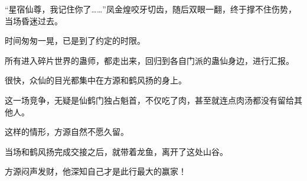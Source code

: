 \begin{this_body}
“星宿仙尊，我记住你了……”凤金煌咬牙切齿，随后双眼一翻，终于撑不住伤势，当场昏迷过去。

时间匆匆一晃，已是到了约定的时限。

所有进入碎片世界的蛊师，都走出来，回归到各自门派的蛊仙身边，进行汇报。

很快，众仙的目光都集中在方源和鹤风扬的身上。

这一场竞争，无疑是仙鹤门独占魁首，不仅吃了肉，甚至就连点肉汤都没有留给其他人。

这样的情形，方源自然不愿久留。

当场和鹤风扬完成交接之后，就带着龙鱼，离开了这处山谷。

方源闷声发财，他深知自己才是此行最大的赢家！

\end{this_body}

